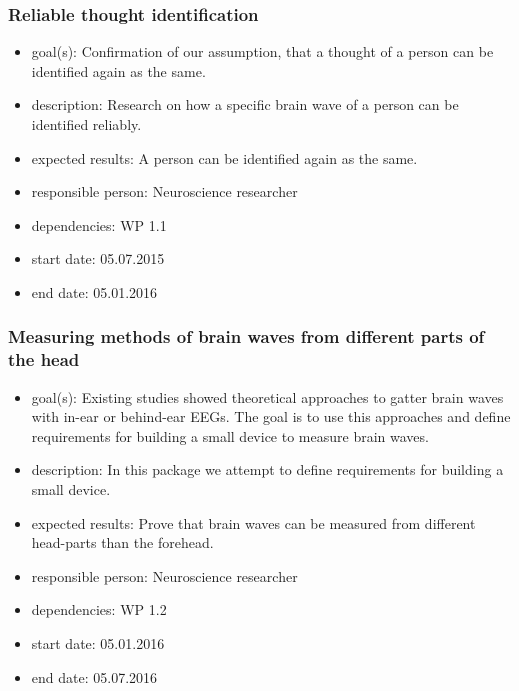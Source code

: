 \subsubsection{Reliable thought identification}
\begin{itemize}
 \item goal(s): Confirmation of our assumption, that a thought of a person can be identified again as the same.
 \item description: Research on how a specific brain wave of a person can be identified reliably.
 \item expected results: A person can be identified again as the same.
 \item responsible person: Neuroscience researcher
 \item dependencies: WP 1.1
 \item start date: 05.07.2015
 \item end date: 05.01.2016
\end{itemize}

\subsubsection{Measuring methods of brain waves from different parts of the head}
\begin{itemize}
 \item goal(s): Existing studies showed theoretical approaches to gatter brain waves with in-ear or behind-ear EEGs. The goal is to use this approaches and define requirements for building a small device to measure brain waves.
 \item description: In this package we attempt to define requirements for building a small device.
 \item expected results: Prove that brain waves can be measured from different head-parts than the forehead.
 \item responsible person: Neuroscience researcher
 \item dependencies: WP 1.2
 \item start date: 05.01.2016
 \item end date: 05.07.2016
\end{itemize}

